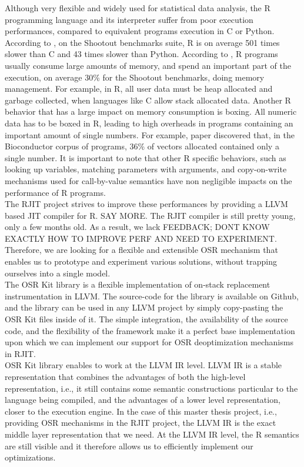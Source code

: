 Although very flexible and widely used for statistical data analysis, the R programming language and its interpreter suffer from poor execution performances, compared to equivalent programs execution in C or Python\cite{morandat2012evaluating}.
According to , on the Shootout benchmarks suite, R is on average 501 times slower than C and 43 times slower than Python.
According to \cite{morandat2012evaluating}, R programs usually consume large amounts of memory, and spend an important part of the execution, on average 30\% for the Shootout benchmarks, doing memory management.
For example, in R, all user data must be heap allocated and garbage collected, when languages like C allow stack allocated data.
Another R behavior that has a large impact on memory consumption is boxing.
All numeric data has to be boxed in R, leading to high overheads in programs containing an important amount of single numbers.
For example, paper \cite{morandat2012evaluating} discovered that, in the Bioconductor corpus of programs, 36\% of vectors allocated contained only a single number.
It is important to note that other R specific behaviors, such as looking up variables, matching parameters with arguments, and copy-on-write mechanisms used for call-by-value semantics have non negligible impacts on the performance of R programs\cite{morandat2012evaluating}.\\

The RJIT project strives to improve these performances by providing a LLVM based JIT compiler for R. SAY MORE.
The RJIT compiler is still pretty young, only a few months old.
As a result, we lack FEEDBACK; DONT KNOW EXACTLY HOW TO IMPROVE PERF AND NEED TO EXPERIMENT.
Therefore, we are looking for a flexible and extensible OSR mechanism that enables us to prototype and experiment various solutions, without trapping ourselves into a single model.\\

The OSR Kit library\cite{OSRKit} is a flexible implementation of on-stack replacement instrumentation in LLVM.
The source-code for the library is available on Github\cite{OSRKitGit}, and the library can be used in any LLVM project by simply copy-pasting the OSR Kit files inside of it.
The simple integration, the availability of the source code, and the flexibility of the framework make it a perfect base implementation upon which we can implement our support for OSR deoptimization mechanisms in RJIT.\\

OSR Kit library enables to work at the LLVM IR level.
LLVM IR is a stable representation that combines the advantages of both the high-level representation, i.e., it still contains some semantic constructions particular to the language being compiled, and the advantages of a lower level representation, closer to the execution engine.
In the case of this master thesis project, i.e., providing OSR mechanisms in the RJIT project, the LLVM IR is the exact middle layer representation that we need. 
At the LLVM IR level, the R semantics are still visible and it therefore allows us to efficiently implement our optimizations.\\

